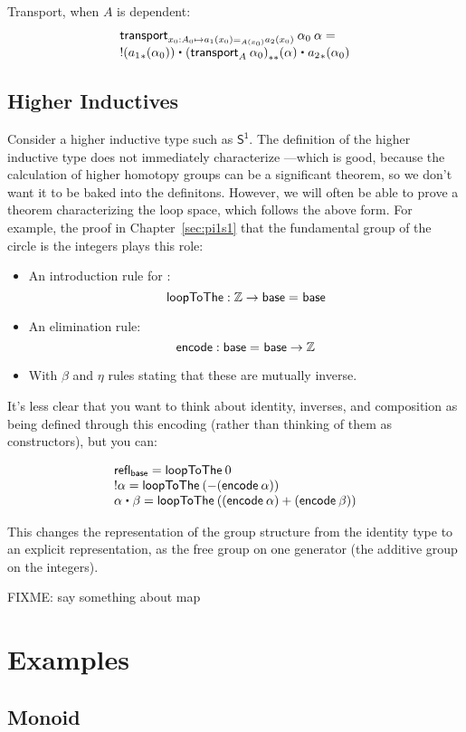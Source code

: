 Transport, when $A$ is dependent:
\[
\begin{array}{l}
\transport{x_0:A_0 \mapsto \id[A(x_0)] {a_1(x_0)}{a_2(x_0)}} {\alpha_0} \: {\alpha} = \\
\opp{(\map{a_1}{\alpha_0})} \ct \mapdep{(\transport{A}{\alpha_0})}{\alpha} \ct \map{a_2}{\alpha_0}
\end{array}
\]

\subsection{Higher Inductives}

\newcommand{\sone}{\mathsf{S^1}}

Consider a higher inductive type such as $\sone$.  The definition of the
higher inductive type does not immediately characterize
\id[\sone]{x}{y}---which is good, because the calculation of higher
homotopy groups can be a significant theorem, so we don't want it to be
baked into the definitons.  However, we will often be able to prove a
theorem characterizing the loop space, which follows the above form.
For example, the proof in Chapter~\ref{sec:pi1s1} that the fundamental
group of the circle is the integers plays this role:

\begin{itemize}
\item An introduction rule for \id[\sone]{\mathsf{base}}{\mathsf{base}}:
  \[
  \mathsf{loopToThe} : \mathbb{Z} \to \mathsf{base} =_{} \mathsf{base}
  \]
\item An elimination rule:
  \[
  \mathsf{encode} : \mathsf{base} =_{} \mathsf{base} \to \mathbb{Z}
  \]
\item With $\beta$ and $\eta$ rules stating that these are mutually inverse.
\end{itemize}

It's less clear that you want to think about identity, inverses, and
composition as being defined through this encoding (rather than thinking
of them as constructors), but you can:

\[
\begin{array}{l}
\refl{\mathsf{base}} = \mathsf{loopToThe} \: 0 \\
\opp{\alpha} = \mathsf{loopToThe} \: (- (\mathsf{encode} \: \alpha)) \\
\alpha \ct \beta = \mathsf{loopToThe} \: ((\mathsf{encode} \: \alpha) + (\mathsf{encode} \: \beta)) \\
\end{array}
\]

This changes the representation of the group structure
from the identity type to an explicit representation, as the free group
on one generator (the additive group on the integers).  

FIXME: say something about map

\section{Examples}

\subsection{Monoid}


